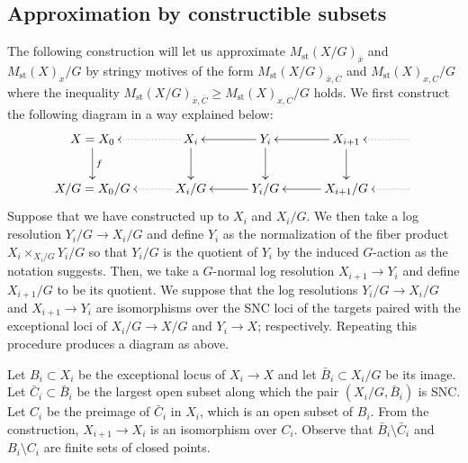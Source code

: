 \documentclass[12pt]{amsart}
\theoremstyle{plain}   %
\theoremstyle{definition}    %
\theoremstyle{remark}    %
\numberwithin{equation}{theorem}
\DeclareMathOperator{\st}{\mathrm{st}}
\begin{document}
\subsection{Approximation by constructible subsets}
The following construction will let us approximate $M_{\st}(X/G)_{\bar{x}}$ and $M_{\st}(X)_x/G$ by stringy motives of the form $M_{\st}(X/G)_{\bar{x},\overline{C}}$ and $M_{\st}(X)_{x,C}/G$ where the inequality $M_{\st}(X/G)_{\bar{x},\overline{C}} \geq M_{\st}(X)_{x,C}/G$ holds.
We first construct the following diagram in a way explained below:
\begin{equation}\label{dia:ladder}
\xymatrix@C=3em{
X=X_0 \ar[d]^-{f} & X_i \ar[d] \ar@{..>}[l] & Y_i \ar[d] \ar[l] & X_{i+1} \ar[d] \ar[l] &  \ar@{..>}[l]  \\
X/G=X_0/G & X_i/G \ar@{..>}[l] & Y_i/G \ar[l] & X_{i+1}/G \ar[l] &  \ar@{..>}[l]
}
\end{equation}
Suppose that we have constructed up to $X_i$ and $X_i/G$. We then take a log resolution $Y_i/G\to X_i/G$ and define $Y_i$ as the normalization of the fiber product $X_i \times_{X_i/G} Y_i/G$ so that $Y_i/G$ is the quotient of $Y_i$ by the induced $G$-action as the notation suggests. Then, we take a $G$-normal log resolution $X_{i+1} \to Y_i$ and define $X_{i+1}/G$ to be its quotient. We suppose that the log resolutions $Y_i/G\to X_i/G$ and $X_{i+1} \to Y_i$ are isomorphisms over the SNC loci of the targets paired with the exceptional loci of $X_i/G\to X/G$ and $Y_i \to X$; respectively. Repeating this procedure produces a diagram as above. 

Let $B_i\subset X_i$ be the exceptional locus of $X_i \to X$ and let $\bar{B}_i\subset X_i/G$ be its image. 
Let $\bar{C}_i\subset \bar{B}_i$ be the largest open subset along which the pair $(X_i/G,\bar{B}_i)$ is SNC.  Let $C_i$ be the preimage of $\bar{C}_i$ in $X_i$, which is an open subset of $B_i$. From the construction, $X_{i+1}\to X_i$ is an isomorphism over $C_i$. Observe that $\bar{B}_i \setminus \bar{C}_i$ and ${B}_i \setminus {C}_i$ are finite sets of closed points. 
\end{document}
